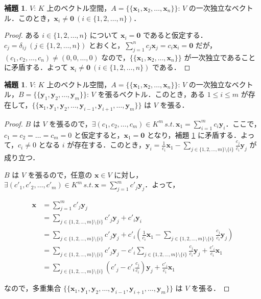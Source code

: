 \documentclass{jlreq}
\theoremstyle{definition}
\newtheorem{lem}[thm]{補題}
\begin{document}
      \begin{lem}\label{linearly-independent-vectors-are-nonzero}
        $V$: $K$ 上のベクトル空間，$A=\{\{\bm{x}_1, \bm{x}_2, \dots, \bm{x}_n\}\}$: $V$ の一次独立なベクトル．このとき，$\bm{x}_i \neq \bm{0} \ (i \in \{1,2,\dots,n\})$．
      \end{lem}
      \begin{proof}
        ある $i \in \{1,2,\dots,n\}$ について $\bm{x}_i = \bm{0}$ であると仮定する．$c_j = \delta_{ij} \ (j \in \{1,2,\dots,n\})$ とおくと，$\sum_{j=1}^nc_j\bm{x}_j=c_i\bm{x}_i=\bm{0}$ だが，$(c_1,c_2,\dots,c_n) \neq (0,0,\dots,0)$ なので，$\{\{\bm{x}_1, \bm{x}_2, \dots, \bm{x}_n\}\}$ が一次独立であることに矛盾する．よって $\bm{x}_i \neq \bm{0} \ (i \in \{1,2,\dots,n\})$ である．
      \end{proof}
      \begin{lem}\label{exchange-lemma}
        $V$: $K$ 上のベクトル空間，$A=\{\{\bm{x}_1, \bm{x}_2, \dots, \bm{x}_n\}\}$: $V$ の一次独立なベクトル，$B=\{\{\bm{y}_1, \bm{y}_2, \dots, \bm{y}_m\}\}$: $V$ を張るベクトル．このとき，ある $1 \leq i \leq m$ が存在して，$\{\{\bm{x}_1, \bm{y}_1, \bm{y}_2, \dots, \bm{y}_{i-1}, \bm{y}_{i+1}, \dots, \bm{y}_m\}\}$ は $V$ を張る．
      \end{lem}
      \begin{proof}
        $B$ は $V$ を張るので，$\exists (c_1, c_2, \dots, c_m) \in K^m \, s.t. \, \bm{x}_1=\sum_{i=1}^m c_i\bm{y}_i$．ここで，$c_1=c_2=\dots=c_m=0$ と仮定すると，$\bm{x}_1=\bm{0}$ となり，補題 \ref{linearly-independent-vectors-are-nonzero} に矛盾する．よって，$c_i \neq 0$ となる $i$ が存在する．このとき，$\bm{y}_i=\frac{1}{c_i}\bm{x}_1-\sum_{j \in \{1,2,\dots,m\} \setminus \{i\}}\frac{c_j}{c_i}\bm{y}_j$ が成り立つ．

        $B$ は $V$ を張るので，任意の $\bm{x} \in V$ に対し，$\exists (c'_1, c'_2, \dots, c'_m) \in K^m \, s.t. \, \bm{x}=\sum_{j=1}^mc'_j\bm{y}_j$．よって，

        \begin{align*}
          \bm{x} &= \sum_{j=1}^mc'_j\bm{y}_j \\
          &= \sum_{j \in \{1,2,\dots,m\} \setminus \{i\}} c'_j\bm{y}_j + c'_i\bm{y}_i \\
          &= \sum_{j \in \{1,2,\dots,m\} \setminus \{i\}} c'_j\bm{y}_j + c'_i\left(\frac{1}{c_i}\bm{x}_1-\sum_{j \in \{1,2,\dots,m\} \setminus \{i\}}\frac{c_j}{c_i}\bm{y}_j\right) \\
          &= \sum_{j \in \{1,2,\dots,m\} \setminus \{i\}}c'_j\bm{y}_j - c'_i\sum_{j \in \{1,2,\dots,m\} \setminus \{i\}}\frac{c_j}{c_i}\bm{y}_j + \frac{c'_i}{c_i}\bm{x}_1\\
          &= \sum_{j \in \{1,2,\dots,m\} \setminus \{i\}}\left(c'_j-c'_i\frac{c_j}{c_i}\right)\bm{y}_j+\frac{c'_i}{c_i}\bm{x}_1
        \end{align*}

        なので，多重集合 $\{\{\bm{x}_1, \bm{y}_1, \bm{y}_2, \dots, \bm{y}_{i-1}, \bm{y}_{i+1}, \dots, \bm{y}_m\}\}$ は $V$ を張る．
      \end{proof}
\end{document}
